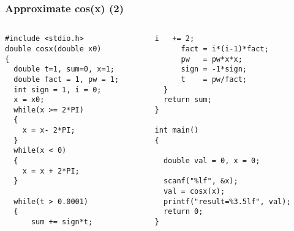 \ifx\answer\undefined
\begin{frame}[fragile]
\frametitle{Approximate cos(x) (2)}
\vspace{-0.27in}
\begin{columns}
\begin{column}{0.44\linewidth}
\begin{lstlisting}
#include <stdio.h>
double cosx(double x0)
{
  double t=1, sum=0, x=1;
  double fact = 1, pw = 1;
  int sign = 1, i = 0;
  x = x0;
  while(x >= 2*PI)
  {
    x = x- 2*PI;
  }
  while(x < 0)
  {
    x = x + 2*PI;
  }

  while(t > 0.0001)
  {
      sum += sign*t;
\end{lstlisting}
\end{column}
\begin{column}{0.53\linewidth}
\begin{lstlisting}[firstnumber=20]
      i   += 2;
      fact = i*(i-1)*fact;
      pw   = pw*x*x;
      sign = -1*sign;
      t    = pw/fact;
  }
  return sum;
}

int main()
{

  double val = 0, x = 0;

  scanf("%lf", &x);
  val = cosx(x);
  printf("result=%3.5lf", val);
  return 0;
}

\end{lstlisting}
\end{column}
\end{columns}
\end{frame}
\fi

